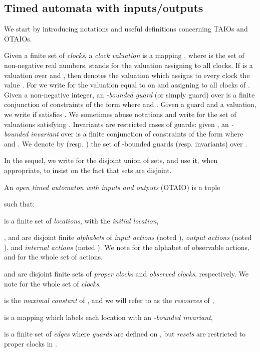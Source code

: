 \documentclass{LMCS}
\theoremstyle{plain}\newtheorem{proposition}[thm]{Proposition}
\begin{document}
\subsection{Timed automata with inputs/outputs}

We start by introducing notations and useful definitions concerning
TAIOs and OTAIOs.

Given  a finite set of {\it clocks}, 
a {\it clock valuation} is a
mapping , where  
is the set of non-negative real numbers.  
 stands for the valuation assigning  to all clocks.
If  is a valuation over
 and , then  denotes the valuation which assigns
to every clock  the value .
For  we write  for the valuation
equal to  on  and 
assigning  to all clocks of .
Given  a non-negative integer, an {\it -bounded guard} (or
simply guard) over  is a finite conjunction of constraints of the
form  where  and . 
Given  a guard and  a valuation, we write  if  satisfies .  We sometimes abuse notations and write  for
the set of valuations satisfying .  Invariants are restricted
cases of guards: given , an {\em -bounded invariant} over
 is a finite conjunction of constraints of the form 
where  and .  
We denote by  (resp.  )
the set of -bounded guards (resp. invariants) over .




In the sequel, we write  for the disjoint union of sets,
  and use it, when appropriate, to insist on the fact that sets are
  disjoint.



\begin{defi}[OTAIO]
\label{def-ta}
An {\em open timed automaton with inputs and outputs} (OTAIO) is a tuple
 
such that: 
\begin{iteMize}{}
\item  is a finite set of {\em locations}, 
with  the {\em initial location}, 
\item ,  and  
are disjoint finite  {\em alphabets} of
{\em input actions} (noted ), 
{\em output actions} (noted ),
and {\em internal actions} (noted ). 
We note  
for the alphabet of observable actions,
and  
for the whole set of actions.
\item  and  are disjoint finite sets of {\em proper
    clocks} and {\em observed clocks}, respectively.  We note  for the whole set of {\em clocks}.
\item  is the {\em maximal constant} of , 
and we will refer to  as the {\em resources} of ,
\item  is a mapping  which labels each location with an {\em -bounded invariant}, 
\item  is a finite set of {\em edges} where {\em guards} 
are defined on ,
but {\em resets} are restricted to proper clocks in .
\end{iteMize}
\end{defi}\medskip
\end{document}
